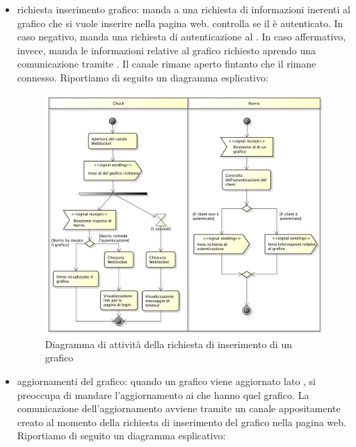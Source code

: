 \begin{itemize}
            \item richiesta inserimento grafico:  manda a  una richiesta di informazioni inerenti al grafico che si vuole inserire nella pagina web.  controlla se il  è autenticato. In caso negativo,  manda una richiesta di autenticazione al . In caso affermativo, invece,  manda le informazioni relative al grafico richiesto aprendo una comunicazione tramite . Il canale rimane aperto fintanto che il  rimane connesso. Riportiamo di seguito un diagramma esplicativo:
            \begin{figure}[H]\centering
        	\includegraphics[width=\textwidth]{SpecificaTecnica/Pics/Chuck/RichiestaGrafico.pdf}
        	\caption{Diagramma di attività della richiesta di inserimento di un grafico}
    		\end{figure}
            \item aggiornamenti del grafico: quando un grafico viene aggiornato lato ,  si preoccupa di mandare l'aggiornamento ai  che hanno quel grafico. La comunicazione dell'aggiornamento avviene tramite un canale  appositamente creato al momento della richiesta di inserimento del grafico nella pagina web. Riportiamo di seguito un diagramma esplicativo:
            \begin{figure}[H]\centering

\end{figure}
\end{itemize}
